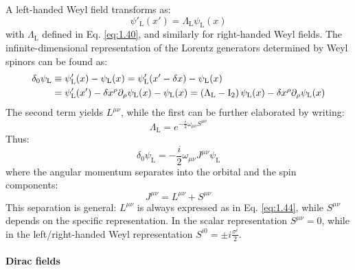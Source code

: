 A left-handed Weyl field transforms as:
\begin{equation}
  \psi'_\text{L}(x') = \Lambda_\text{L} \psi_\text{L}(x)
  \label{eq:1.46}
\end{equation}
with $ \Lambda_\text{L} $ defined in Eq. \ref{eq:1.40}, and similarly for right-handed Weyl fields. The infinite-dimensional representation of the Lorentz generators determined by Weyl spinors can be found as:
\begin{equation*}
  \begin{split}
    \delta_0 \psi_\text{L} &\equiv \psi'_\text{L}(x) - \psi_\text{L}(x) = \psi'_\text{L}(x' - \delta x) - \psi_\text{L}(x) \\
                           &= \psi'_\text{L}(x') - \delta x^\rho \partial_\rho \psi_\text{L}(x) - \psi_\text{L}(x) = \left( \Lambda_\text{L} - \mathrm{I}_2 \right) \psi_\text{L}(x) - \delta x^\rho \partial_\rho \psi_\text{L}(x)
  \end{split}
\end{equation*}
The second term yields $ L^{\mu \nu} $, while the first can be further elaborated by writing:
\begin{equation}
  \Lambda_\text{L} = e^{-\frac{i}{2} \omega_{\mu \nu} S^{\mu \nu}}
  \label{eq:1.47}
\end{equation}
Thus:
\begin{equation*}
  \delta_0 \psi_\text{L} = - \frac{i}{2} \omega_{\mu \nu} J^{\mu \nu} \psi_\text{L}
\end{equation*}
where the angular momentum separates into the orbital and the spin components:
\begin{equation}
  J^{\mu \nu} = L^{\mu \nu} + S^{\mu \nu}
  \label{eq:1.48}
\end{equation}
This separation is general: $ L^{\mu \nu} $ is always expressed as in Eq. \ref{eq:1.44}, while $ S^{\mu \nu} $ depends on the specific representation. In the scalar representation $ S^{\mu \nu} = 0 $, while in the left/right-handed Weyl representation $ S^{i0} = \pm i \frac{\sigma^i}{2} $.

\paragraph{Dirac fields}


